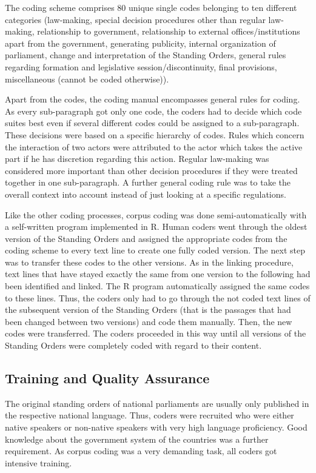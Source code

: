 \documentclass[10pt,]{article}
\begin{document}
The coding scheme comprises 80 unique single codes belonging to ten
different categories (law-making, special decision procedures other than
regular law-making, relationship to government, relationship to external
offices/institutions apart from the government, generating publicity,
internal organization of parliament, change and interpretation of the
Standing Orders, general rules regarding formation and legislative
session/discontinuity, final provisions, miscellaneous (cannot be coded
otherwise)).

Apart from the codes, the coding manual encompasses general rules for
coding. As every sub-paragraph got only one code, the coders had to
decide which code suites best even if several different codes could be
assigned to a sub-paragraph. These decisions were based on a specific
hierarchy of codes. Rules which concern the interaction of two actors
were attributed to the actor which takes the active part if he has
discretion regarding this action. Regular law-making was considered more
important than other decision procedures if they were treated together
in one sub-paragraph. A further general coding rule was to take the
overall context into account instead of just looking at a specific
regulations.

Like the other coding processes, corpus coding was done
semi-automatically with a self-written program implemented in R. Human
coders went through the oldest version of the Standing Orders and
assigned the appropriate codes from the coding scheme to every text line
to create one fully coded version. The next step was to transfer these
codes to the other versions. As in the linking procedure, text lines
that have stayed exactly the same from one version to the following had
been identified and linked. The R program automatically assigned the
same codes to these lines. Thus, the coders only had to go through the
not coded text lines of the subsequent version of the Standing Orders
(that is the passages that had been changed between two versions) and
code them manually. Then, the new codes were transferred. The coders
proceeded in this way until all versions of the Standing Orders were
completely coded with regard to their content.

\subsection{Training and Quality
Assurance}\label{training-and-quality-assurance-1}

The original standing orders of national parliaments are usually only
published in the respective national language. Thus, coders were
recruited who were either native speakers or non-native speakers with
very high language proficiency. Good knowledge about the government
system of the countries was a further requirement. As corpus coding was
a very demanding task, all coders got intensive training.
\end{document}
